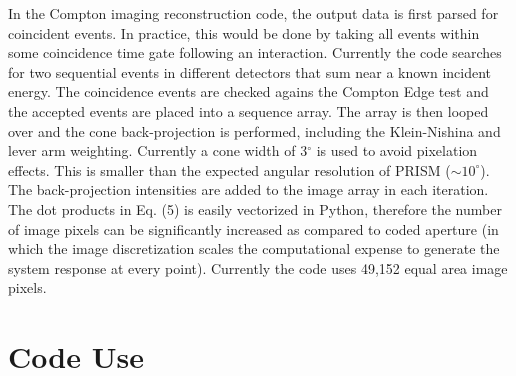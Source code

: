 \documentclass[10pt]{article}
\begin{document}
%

In the Compton imaging reconstruction code, the output data is first parsed for coincident events. In practice, this would be done by taking all events within some coincidence time gate following an interaction. Currently the code searches for two sequential events in different detectors that sum near a known incident energy. The coincidence events are checked agains the Compton Edge test and the accepted events are placed into a sequence array. The array is then looped over and the cone back-projection is performed, including the Klein-Nishina and lever arm weighting. Currently a cone width of 3$^\circ$ is used to avoid pixelation effects. This is smaller than the expected angular resolution of PRISM ($\sim10^\circ$). The back-projection intensities are added to the image array in each iteration. The dot products in Eq. (5) is easily vectorized in Python, therefore the number of image pixels can be significantly increased as compared to coded aperture (in which the image discretization scales the computational expense to generate the system response at every point). Currently the code uses 49,152 equal area image pixels.




\section{Code Use}
\end{document}
